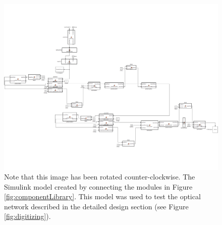 \documentclass[pdftex,12pt,a4paper]{article}
\begin{document}
\begin{figure}[H]
  \centering
    \includegraphics[scale=0.8, angle=90]{Digitizing_2Pi.pdf}
  \caption{Note that this image has been rotated counter-clockwise. The Simulink model created by connecting the modules in Figure \ref{fig:componentLibrary}. This model was used to test the optical network described in the detailed design section (see Figure \ref{fig:digitizing}).}
  \label{fig:simulink}
\end{figure}
\end{document}
